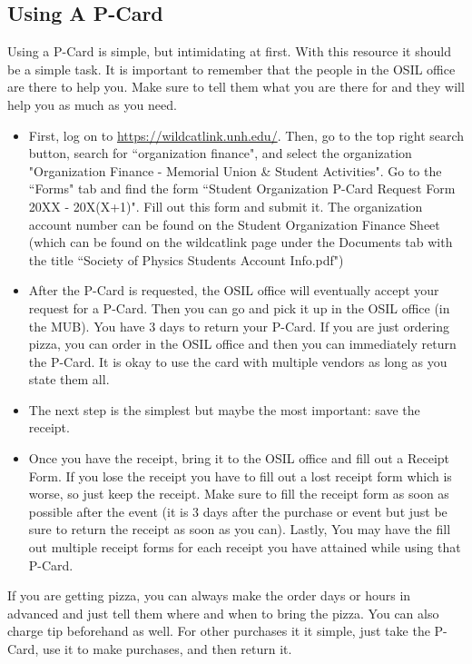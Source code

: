\documentclass[12pt,epsfig]{article}
\begin{document}
\subsection{Using A P-Card} \label{Using A P-Card}
Using a P-Card is simple, but intimidating at first. With this resource it should be a simple task. It is important to remember that the people in the OSIL office are there to help you. Make sure to tell them what you are there for and they will help you as much as you need.

\begin{itemize}
	\item First, log on to \url{https://wildcatlink.unh.edu/}. Then, go to the top right search button, search for ``organization finance", and select the organization "Organization Finance - Memorial Union \& Student Activities". Go to the ``Forms" tab and find the form ``Student Organization P-Card Request Form 20XX - 20X(X+1)". Fill out this form and submit it. The organization account number can be found on the Student Organization Finance Sheet (which can be found on the wildcatlink page under the Documents tab with the title ``Society of Physics Students Account Info.pdf")

	\item After the P-Card is requested, the OSIL office will eventually accept your request for a P-Card. Then you can go and pick it up in the OSIL office (in the MUB). You have 3 days to return your P-Card. If you are just ordering pizza, you can order in the OSIL office and then you can immediately return the P-Card. It is okay to use the card with multiple vendors as long as you state them all.

	\item The next step is the simplest but maybe the most important: save the receipt.

	\item Once you have the receipt, bring it to the OSIL office and fill out a Receipt Form. If you lose the receipt you have to fill out a lost receipt form which is worse, so just keep the receipt. Make sure to fill the receipt form as soon as possible after the event (it is 3 days after the purchase or event but just be sure to return the receipt as soon as you can). Lastly, You may have the fill out multiple receipt forms for each receipt you have attained while using that P-Card. 
\end{itemize}

If you are getting pizza, you can always make the order days or hours in advanced and just tell them where and when to bring the pizza. You can also charge tip beforehand as well. For other purchases it it simple, just take the P-Card, use it to make purchases, and then return it.
\end{document}
